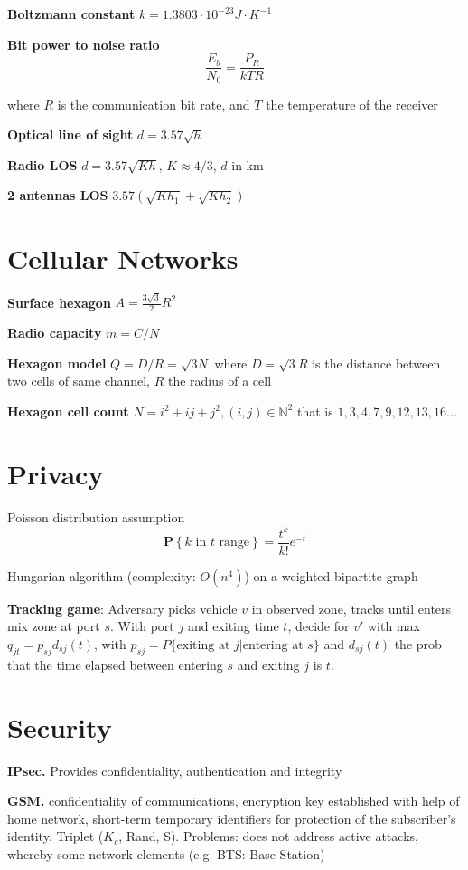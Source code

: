 \documentclass[10pt,twocolumn]{article}
\renewcommand{\l}{\left}
\renewcommand{\r}{\right}
\renewcommand{\bf}{\textbf}
\renewcommand{\P}[1]{\mathbf{P}\l\{#1\r\}}
\newcommand{\bN}{\mathbb{N}}
\begin{document}
\bf{Boltzmann constant} $ k = 1.3803 \cdot 10^{-23} J\cdot K^{-1}$

\bf{Bit power to noise ratio}
\[
  \frac{E_b}{N_0}=\frac{P_R}{kTR}
\]

where $R$ is the communication bit rate, and $T$ the temperature of the receiver

\bf{Optical line of sight} $d = 3.57\sqrt h$

\bf{Radio LOS} $d = 3.57\sqrt {Kh}$, $K \approx 4/3$, $d$ in km

\bf{2 antennas LOS} $3.57(\sqrt{Kh_1} + \sqrt{Kh_2})$

\section{Cellular Networks}


\textbf{Surface hexagon} $A = \frac{3\sqrt 3} 2 R^2$

\bf{Radio capacity} $m = C/N$

\bf{Hexagon model} $Q=D/R = \sqrt{3N}$ where $D=\sqrt{3}R$ is the distance between two cells of same channel, $R$ the radius of a cell

\bf{Hexagon cell count} $N=i^2+ij+j^2, (i,j) \in \bN^2$ that is $1,3,4,7,9,12,13,16...$

\section{Privacy}

Poisson distribution assumption
\[
  \P{k \text{ in } t \text{ range}} = \frac{t^k}{k!}e^{-t}
\]


Hungarian algorithm (complexity: $O(n^4)$) on a weighted bipartite graph

\textbf{Tracking game}: Adversary picks vehicle $v$ in observed zone, tracks until enters mix zone at port $s$. With port $j$ and exiting time $t$, decide for $v'$ with max $q_{jt} = p_{sj}d_{sj}(t)$, with $p_{sj} = P\{\text{exiting at } j | \text{entering at } s\}$ and $d_{sj}(t)$ the prob that the time elapsed between entering $s$ and exiting $j$ is $t$.

\section{Security}

\bf{IPsec.} Provides confidentiality, authentication and integrity

\bf{GSM.} confidentiality of communications, encryption key established with help of home network, short-term temporary identifiers for protection of the subscriber’s identity. Triplet ($K_c$, Rand, S). Problems: does not address active attacks, whereby some network elements (e.g. BTS: Base Station)
\end{document}
